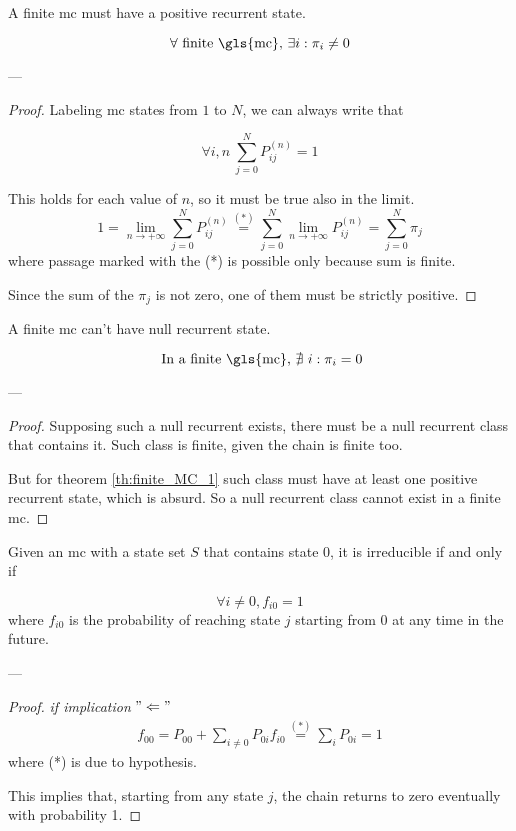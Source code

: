 	\begin{theorem} \label{th:finite_MC_1}
		A finite \gls{mc} must have a positive recurrent state.

		$$ \forall \text{ finite \gls{mc}, } \exists i: \pi_i \neq 0 $$
	\end{theorem}
	---
	\begin{proof}
		Labeling \gls{mc} states from $1$ to $N$, we can always write that

		$$ \forall i, n ~ \sum_{j=0}^N P_{ij}^{(n)} = 1$$

		This holds for each value of $n$, so it must be true also in the limit.
		$$ 1 = \lim_{n \to +\infty} \sum_{j=0}^N P_{ij}^{(n)} \stackrel{(*)}{=} \sum_{j=0}^N \lim_{n \to +\infty} P_{ij}^{(n)}
		= \sum_{j=0}^N \pi_j $$
		where passage marked with the (*) is possible only because sum is finite.

		Since the sum of the $\pi_j$ is not zero, one of them must be strictly positive.
	\end{proof}

	\begin{theorem}
		A finite \gls{mc} can't have null recurrent state.

		$$ \text{ In a finite \gls{mc}, } \nexists~ i: \pi_i = 0 $$
	\end{theorem}
	---
	\begin{proof}
		Supposing such a null recurrent exists, there must be a null recurrent class that contains it.
		Such class is finite, given the chain is finite too.

		But for theorem \ref{th:finite_MC_1} such class must have at least one positive recurrent state, which is absurd.
		So a null recurrent class cannot exist in a finite \gls{mc}.
	\end{proof}

	\begin{lemma}[Ross 2, pg. 78-82] \label{lemma:MC_irreducible_fi0}
		Given an \gls{mc} with a state set $S$ that contains state 0, it is irreducible if and only if

		$$ \forall i \neq 0, f_{i 0} = 1 $$
		where $f_{i 0}$ is the probability of reaching state $j$ starting from 0 at any time in the future.
	\end{lemma}
	---
	\begin{proof} \emph{if implication} $"\Leftarrow"$
		\begin{equation}\begin{split}
			f_{00} = P_{00} + \sum_{i \neq 0} P_{0i} f_{i 0} \stackrel{(*)}{=} \sum_{i} P_{0i} = 1
		\end{split}\end{equation}
		where (*) is due to hypothesis.

		This implies that, starting from any state $j$, the chain returns to zero eventually with probability 1.
	\end{proof}

